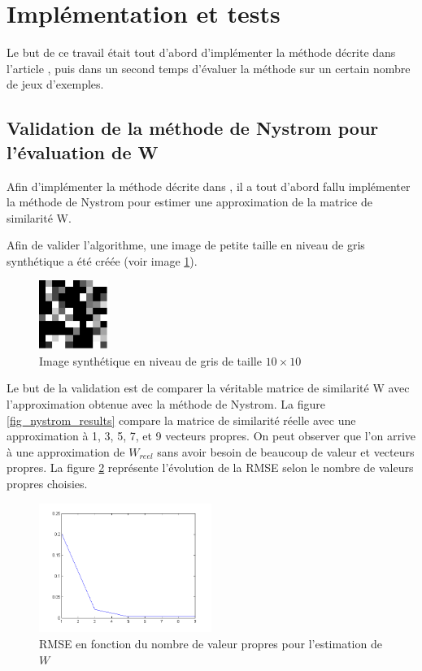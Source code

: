\section{Implémentation et tests}

Le but de ce travail était tout d'abord d'implémenter la méthode décrite dans l'article \cite{farbman2011tonal}, puis dans un second temps d'évaluer la méthode sur un certain nombre de jeux d'exemples. 

\subsection{Validation de la méthode de Nystrom pour l'évaluation de W}
Afin d'implémenter la méthode décrite dans \cite{farbman2011tonal}, il a tout d'abord fallu implémenter la méthode de Nystrom pour estimer une approximation de la matrice de similarité W.

Afin de valider l'algorithme, une image de petite taille en niveau de gris synthétique a été créée (voir image \ref{nystrom_synth}).

\begin{figure}[h]
\centering
\includegraphics[width=0.2\textwidth]{Chapters/Images/nystrom_synthetic}
\caption{Image synthétique en niveau de gris de taille $10\times 10$}
\label{nystrom_synth}
\end{figure}

Le but de la validation est de comparer la véritable matrice de similarité W avec l'approximation obtenue avec la méthode de Nystrom. La figure \ref{fig_nystrom_results} compare la matrice de similarité réelle avec une approximation à 1, 3, 5, 7, et 9 vecteurs propres. On peut observer que l'on arrive à une approximation de $W_{reel}$ sans avoir besoin de beaucoup de valeur et vecteurs propres. La figure \ref{fig_rms} représente l'évolution de la RMSE selon le nombre de valeurs propres choisies.

\begin{figure}[H]
\centering
\includegraphics[width = 0.5\textwidth]{Chapters/Images/rms}
\caption{RMSE en fonction du nombre de valeur propres pour l'estimation de $W$}
\label{fig_rms}
\end{figure}

